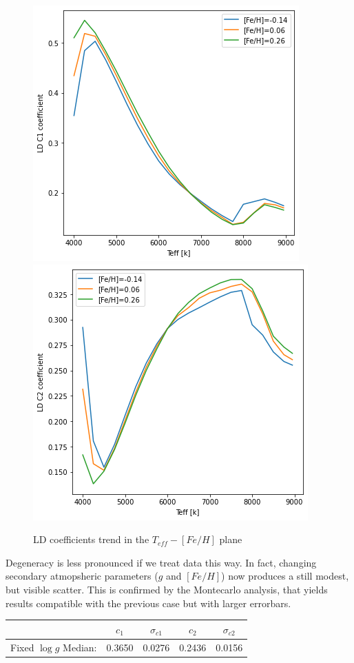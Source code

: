 \documentclass[a4paper,11pt,twocolumn]{article}
\begin{document}
\begin{figure}[H]
    \centering  
    \includegraphics[scale=0.5, angle=0]{../pictures/Claret2017/double_c1}
    \includegraphics[scale=0.5, angle=0]{../pictures/Claret2017/double_c2}
    \caption{LD coefficients trend in the $T_{eff}-[Fe/H]$ plane}
\end{figure}
Degeneracy is less pronounced if we treat data this way. In fact, changing 
secondary atmopsheric parameters ($g$ and $[Fe/H]$) now produces a still 
modest, but visible scatter. This is confirmed by the Montecarlo analysis, 
that yields results compatible with the previous case but with larger errorbars.
\begin{table}[h!]
	\centering
	\begin{tabular}{ccccc}
		\hline
		& $c_1$ & $\sigma_{c1}$ & $c_2$ & $\sigma_{c2}$\\
		\hline
		Fixed $\log{g}$ Median: & 0.3650 & 0.0276 & 0.2436 & 0.0156 \\
		\hline
	\end{tabular} 
\end{table}
\end{document}
